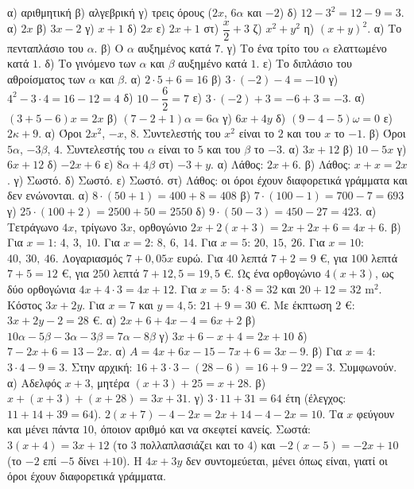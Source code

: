  α) αριθμητική \quad β) αλγεβρική \quad γ) τρεις όρους ($2x$, $6\alpha$ και $-2$) \quad δ) $12-3^2=12-9=3$.
 α) $2x$ \quad β) $3x-2$ \quad γ) $x+1$ \quad δ) $2x$ \quad ε) $2x+1$ \quad στ) $\dfrac{x}{2}+3$ \quad ζ) $x^2+y^2$ \quad η) $(x+y)^2$.
 α) Το πενταπλάσιο του $\alpha$. \quad β) Ο $\alpha$ αυξημένος κατά $7$. \quad γ) Το ένα τρίτο του $\alpha$ ελαττωμένο κατά $1$. \quad δ) Το γινόμενο των $\alpha$ και $\beta$ αυξημένο κατά $1$. \quad ε) Το διπλάσιο του αθροίσματος των $\alpha$ και $\beta$.
 α) $2\cdot5+6=16$ \quad β) $3\cdot(-2)-4=-10$ \quad γ) $4^2-3\cdot4=16-12=4$ \quad δ) $10-\dfrac{6}{2}=7$ \quad ε) $3\cdot(-2)+3=-6+3=-3$.
 α) $(3+5-6)x=2x$ \quad β) $(7-2+1)\alpha=6\alpha$ \quad γ) $6x+4y$ \quad δ) $(9-4-5)\omega=0$ \quad ε) $2\kappa+9$.
 α) Όροι $2x^2$, $-x$, $8$. Συντελεστής του $x^2$ είναι το $2$ και του $x$ το $-1$. \quad β) Όροι $5\alpha$, $-3\beta$, $4$. Συντελεστής του $\alpha$ είναι το $5$ και του $\beta$ το $-3$.
 α) $3x+12$ \quad β) $10-5x$ \quad γ) $6x+12$ \quad δ) $-2x+6$ \quad ε) $8\alpha+4\beta$ \quad στ) $-3+y$.
 α) Λάθος: $2x+6$. \quad β) Λάθος: $x+x=2x$. \quad γ) Σωστό. \quad δ) Σωστό. \quad ε) Σωστό. \quad στ) Λάθος: οι όροι έχουν διαφορετικά γράμματα και δεν ενώνονται.
 α) $8\cdot(50+1)=400+8=408$ \quad β) $7\cdot(100-1)=700-7=693$ \quad γ) $25\cdot(100+2)=2500+50=2550$ \quad δ) $9\cdot(50-3)=450-27=423$.
 α) Τετράγωνο $4x$, τρίγωνο $3x$, ορθογώνιο $2x+2(x+3)=2x+2x+6=4x+6$. \quad β) Για $x=1$: $4,\ 3,\ 10$. Για $x=2$: $8,\ 6,\ 14$. Για $x=5$: $20,\ 15,\ 26$. Για $x=10$: $40,\ 30,\ 46$.
 Λογαριασμός $7+0{,}05x$ ευρώ. Για $40$ λεπτά $7+2=9$ €, για $100$ λεπτά $7+5=12$ €, για $250$ λεπτά $7+12{,}5=19{,}5$ €.
 Ως ένα ορθογώνιο $4(x+3)$, ως δύο ορθογώνια $4x+4\cdot3=4x+12$. Για $x=5$: $4\cdot8=32$ και $20+12=32$ m$^2$.
 Κόστος $3x+2y$. Για $x=7$ και $y=4{,}5$: $21+9=30$ €. Με έκπτωση $2$ €: $3x+2y-2=28$ €.
 α) $2x+6+4x-4=6x+2$ \quad β) $10\alpha-5\beta-3\alpha-3\beta=7\alpha-8\beta$ \quad γ) $3x+6-x+4=2x+10$ \quad δ) $7-2x+6=13-2x$.
 α) $A=4x+6x-15-7x+6=3x-9$. \quad β) Για $x=4$: $3\cdot4-9=3$. Στην αρχική: $16+3\cdot3-(28-6)=16+9-22=3$. Συμφωνούν.
 α) Αδελφός $x+3$, μητέρα $(x+3)+25=x+28$. \quad β) $x+(x+3)+(x+28)=3x+31$. \quad γ) $3\cdot11+31=64$ έτη (έλεγχος: $11+14+39=64$).
 $2(x+7)-4-2x=2x+14-4-2x=10$. Τα $x$ φεύγουν και μένει πάντα $10$, όποιον αριθμό και να σκεφτεί κανείς.
 Σωστά: $3(x+4)=3x+12$ (το $3$ πολλαπλασιάζει και το $4$) και $-2(x-5)=-2x+10$ (το $-2$ επί $-5$ δίνει $+10$). Η $4x+3y$ δεν συντομεύεται, μένει όπως είναι, γιατί οι όροι έχουν διαφορετικά γράμματα.
